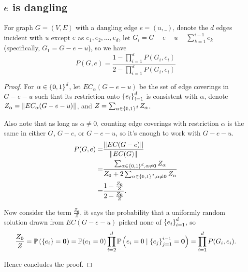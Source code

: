 \subsection{$e$ is dangling}
\begin{Prop}
For graph $G=(V,E)$ with a dangling edge $e=(u,\_)$, denote the $d$ 
edges incident with $u$ except $e$ as $e_1, e_2, \ldots, e_d$,
let $G_i = G - e - u - \sum_{k=1}^{i-1} e_k$ (specifically, $G_1 = G - e - u$), so we have%
	\begin{equation}
		P(G, e) = \frac{1-\prod_{i=1}^d P(G_i, e_i)}{2 - \prod_{i=1}^d P(G_i, e_i)} %
		\label{propp3rg}
	\end{equation}
\end{Prop}
\begin{proof}
	For $\alpha \in \left\{0,1\right\}^d$, let $EC_{\alpha}(G-e-u)$ be the set of edge coverings in $G-e-u$ such that its restriction onto $\left\{e_i\right\}_{i=1}^{d}$ is consistent with $\alpha$, denote $Z_{\alpha} = \left\Vert EC_{\alpha}(G-e-u)\right\Vert$, and $Z = \sum_{\alpha \in \left\{0,1\right\}^d} Z_{\alpha}$. %

		Also note that as long as $\alpha \neq 0$, counting edge coverings with restriction $\alpha$ is the same in either $G$, $G-e$, or $G-e-u$, so it's enough to work with $G-e-u$.
	\begin{align*}
		P(G,e) = & \frac{\left\Vert EC(G-e)\right\Vert}{\left\Vert EC(G)\right\Vert} \\
		=& \frac{\sum_{\alpha \in \left\{0,1\right\}^d, \alpha \neq \mathbf{0}} Z_{\alpha} }{ Z_{\mathbf{0}} + 2 \sum_{\alpha \in \left\{0,1\right\}^d, \alpha \neq \mathbf{0}} Z_{\alpha}} \\
		=& \frac{1 - \frac{Z_{\mathbf{0}}}{Z}}{ 2 - \frac{Z_{\mathbf{0}}}{Z}}.
	\end{align*}

	Now consider the term $\frac{Z_{\mathbf{0}}}{Z}$, it says the probability that a uniformly random solution drawn from $EC(G-e-u)$ picked none of $\left\{e_i\right\}_{i=1}^{d}$, so
	\begin{align*}
		\frac{Z_{\mathbf{0}}}{Z}=\mathbb{P} \left( \left\{e_i\right\} = \mathbf{0}\right) = \mathbb{P} (e_1 = 0) \prod_{i=2}^d \mathbb{P} \left(e_i = 0 \mid \left\{e_j\right\}_{j=1}^{i-1} = \mathbf{0}\right) = \prod_{i=1}^d P(G_i, e_i).
	\end{align*}

	Hence concludes the proof.
	
\end{proof}


